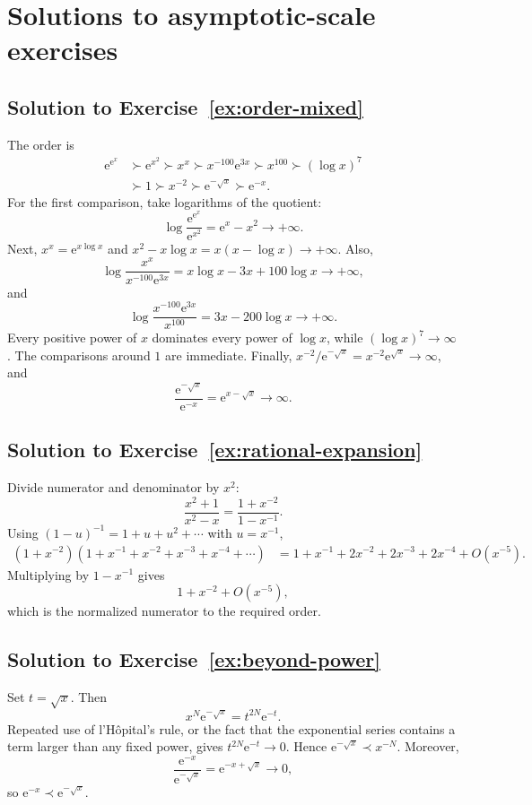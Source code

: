 \documentclass[11pt,oneside]{book}
\theoremstyle{definition}
\theoremstyle{remark}
\newcommand{\e}{\mathrm{e}}
\newcommand{\bigO}{O}
\newcommand{\precdom}{\prec}
\newcommand{\succdom}{\succ}
\begin{document}
\section{Solutions to asymptotic-scale exercises}

\subsection*{Solution to Exercise~\ref{ex:order-mixed}}

The order is
\begin{align*}
  \e^{\e^x}
  &\succdom \e^{x^2}
  \succdom x^x
  \succdom x^{-100}\e^{3x}
  \succdom x^{100}
  \succdom(\log x)^7\\
  &\succdom1
  \succdom x^{-2}
  \succdom\e^{-\sqrt x}
  \succdom\e^{-x}.
\end{align*}
For the first comparison, take logarithms of the quotient:
\[
  \log\frac{\e^{\e^x}}{\e^{x^2}}=\e^x-x^2\to+\infty.
\]
Next, $x^x=\e^{x\log x}$ and
$x^2-x\log x=x(x-\log x)\to+\infty$. Also,
\[
  \log\frac{x^x}{x^{-100}\e^{3x}}
  =x\log x-3x+100\log x\to+\infty,
\]
and
\[
  \log\frac{x^{-100}\e^{3x}}{x^{100}}
  =3x-200\log x\to+\infty.
\]
Every positive power of $x$ dominates every power of $\log x$, while
$(\log x)^7\to\infty$. The comparisons around $1$ are immediate. Finally,
$x^{-2}/\e^{-\sqrt x}=x^{-2}\e^{\sqrt x}\to\infty$, and
\[
  \frac{\e^{-\sqrt x}}{\e^{-x}}=\e^{x-\sqrt x}\to\infty.
\]

\subsection*{Solution to Exercise~\ref{ex:rational-expansion}}

Divide numerator and denominator by $x^2$:
\[
  \frac{x^2+1}{x^2-x}
  =\frac{1+x^{-2}}{1-x^{-1}}.
\]
Using $(1-u)^{-1}=1+u+u^2+\cdots$ with $u=x^{-1}$,
\begin{align*}
  (1+x^{-2})(1+x^{-1}+x^{-2}+x^{-3}+x^{-4}+\cdots)
  &=1+x^{-1}+2x^{-2}+2x^{-3}+2x^{-4}
    +\bigO(x^{-5}).
\end{align*}
Multiplying by $1-x^{-1}$ gives
\[
  1+x^{-2}+\bigO(x^{-5}),
\]
which is the normalized numerator to the required order.

\subsection*{Solution to Exercise~\ref{ex:beyond-power}}

Set $t=\sqrt x$. Then
\[
  x^N\e^{-\sqrt x}=t^{2N}\e^{-t}.
\]
Repeated use of l'H\^opital's rule, or the fact that the exponential series
contains a term larger than any fixed power, gives
$t^{2N}\e^{-t}\to0$. Hence $\e^{-\sqrt x}\precdom x^{-N}$.
Moreover,
\[
  \frac{\e^{-x}}{\e^{-\sqrt x}}
  =\e^{-x+\sqrt x}\to0,
\]
so $\e^{-x}\precdom\e^{-\sqrt x}$.
\end{document}
